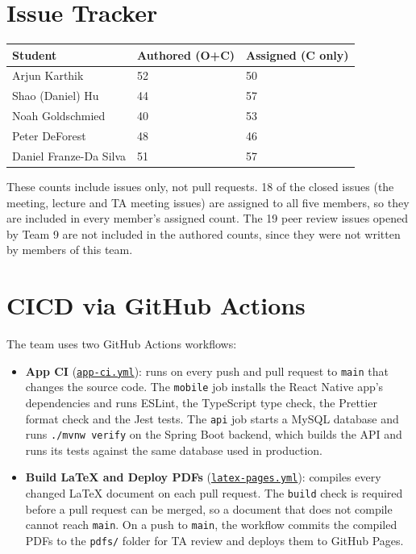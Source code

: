\documentclass{article}
\begin{document}
\section{Issue Tracker}

\begin{table}[H]
\centering
\begin{tabular}{lll}
\toprule
\textbf{Student} & \textbf{Authored (O+C)} & \textbf{Assigned (C only)}\\
\midrule
Arjun Karthik & 52 & 50 \\
Shao (Daniel) Hu & 44 & 57 \\
Noah Goldschmied & 40 & 53 \\
Peter DeForest & 48 & 46 \\
Daniel Franze-Da Silva & 51 & 57 \\
\bottomrule
\end{tabular}
\end{table}

These counts include issues only, not pull requests. 18 of the closed issues
(the meeting, lecture and TA meeting issues) are assigned to all five members,
so they are included in every member's assigned count. The 19 peer review
issues opened by Team 9 are not included in the authored counts, since they
were not written by members of this team.

\section{CICD via GitHub Actions}

The team uses two GitHub Actions workflows:
\begin{itemize}
    \item \textbf{App CI}
    (\href{https://github.com/arjunkarthik123/fitness-finance-application/blob/main/.github/workflows/app-ci.yml}{\texttt{app-ci.yml}}):
    runs on every push and pull request to \texttt{main} that changes the
    source code. The \texttt{mobile} job installs the React Native app's
    dependencies and runs ESLint, the TypeScript type check, the Prettier
    format check and the Jest tests. The \texttt{api} job starts a MySQL
    database and runs \texttt{./mvnw verify} on the Spring Boot backend, which
    builds the API and runs its tests against the same database used in
    production.
    \item \textbf{Build LaTeX and Deploy PDFs}
    (\href{https://github.com/arjunkarthik123/fitness-finance-application/blob/main/.github/workflows/latex-pages.yml}{\texttt{latex-pages.yml}}):
    compiles every changed LaTeX document on each pull request. The
    \texttt{build} check is required before a pull request can be merged, so
    a document that does not compile cannot reach \texttt{main}. On a push to
    \texttt{main}, the workflow commits the compiled PDFs to the
    \texttt{pdfs/} folder for TA review and deploys them to GitHub Pages.
\end{itemize}
\end{document}
